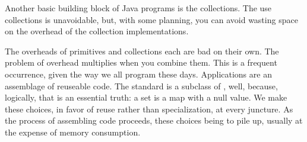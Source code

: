 
Another basic building block of Java programs is the collections. The use
collections is unavoidable, but, with some planning, you can avoid wasting space
on the overhead of the collection implementations.




The overheads of primitives and collections each are bad on their own. The
problem of overhead multiplies when you combine them. This is a frequent
occurrence, given the way we all program these days. Applications are an
assemblage of reuseable code. The standard  is a subclass of
, well, because, logically, that is an essential truth: a set is
a map with a null value. We make these choices, in favor of reuse rather than
specialization, at every juncture. As the process of assembling code proceeds,
these choices being to pile up, usually at the expense of memory consumption.

